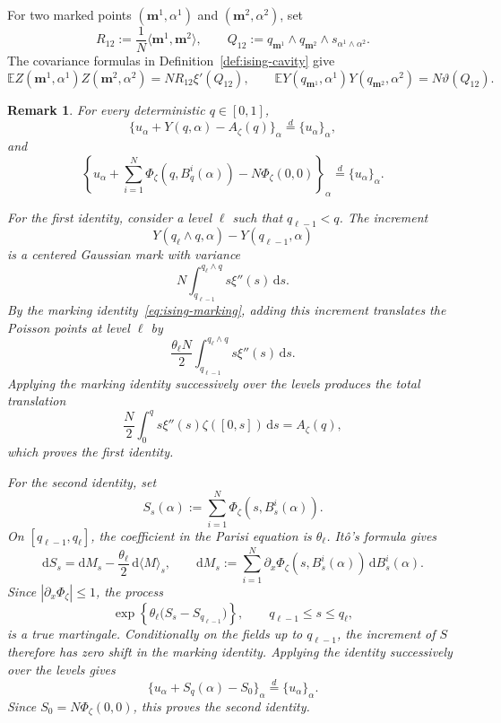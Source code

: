 \documentclass[a4paper,10pt,reqno]{amsart}
\numberwithin{equation}{section}
\newtheorem{remark}{Remark}[section]%
\newcommand{\dE}{\mathbb{E}}%
\newcommand{\dd}{\mathrm{d}}
\newcommand{\bfm}{\mathbf{m}}
\begin{document}
	For two marked points $(\bfm^1,\alpha^1)$ and
	$(\bfm^2,\alpha^2)$, set
	\[
	R_{12}:=\frac1N\langle\bfm^1,\bfm^2\rangle,
	\qquad
	Q_{12}:=
	q_{\bfm^1}\wedge q_{\bfm^2}\wedge
	s_{\alpha^1\wedge\alpha^2}.
	\]
	The covariance formulas in Definition~\ref{def:ising-cavity} give
	\begin{equation}\label{eq:ising-covs}
		\dE Z(\bfm^1,\alpha^1)Z(\bfm^2,\alpha^2)
		=
		NR_{12}\xi'(Q_{12}),
		\qquad
		\dE Y(q_{\bfm^1},\alpha^1)Y(q_{\bfm^2},\alpha^2)
		=
		N\vartheta(Q_{12}).
	\end{equation}
	\begin{remark}\label{rem:ising-invariance}
		For every deterministic $q\in[0,1]$,
		\[
		\{u_\alpha+Y(q,\alpha)-A_\zeta(q)\}_\alpha
		\stackrel d=
		\{u_\alpha\}_\alpha,
		\]
		and
		\[
		\left\{
		u_\alpha
		+
		\sum_{i=1}^N\Phi_\zeta(q,B_q^i(\alpha))
		-
		N\Phi_\zeta(0,0)
		\right\}_\alpha
		\stackrel d=
		\{u_\alpha\}_\alpha.
		\]
		
		For the first identity, consider a level $\ell$ such that $q_{\ell-1}<q$. The increment
		\[
		Y(q_\ell\wedge q,\alpha)-Y(q_{\ell-1},\alpha)
		\]
		is a centered Gaussian mark with variance
		\[
		N\int_{q_{\ell-1}}^{q_\ell\wedge q}s\xi''(s)\,\dd s.
		\]
		By the marking identity~\eqref{eq:ising-marking}, adding this increment translates the Poisson points at level
		$\ell$ by
		\[
		\frac{\theta_\ell N}{2}
		\int_{q_{\ell-1}}^{q_\ell\wedge q}s\xi''(s)\,\dd s.
		\]
		Applying the marking identity successively over the levels produces the total translation
		\[
		\frac N2\int_0^q s\xi''(s)\zeta([0,s])\,\dd s=A_\zeta(q),
		\]
		which proves the first identity.
		
		For the second identity, set
		\[
		S_s(\alpha):=\sum_{i=1}^N\Phi_\zeta(s,B_s^i(\alpha)).
		\]
		On $[q_{\ell-1},q_\ell]$, the coefficient in the Parisi equation is $\theta_\ell$. It\^o's formula gives
		\[
		\dd S_s
		=
		\dd M_s-\frac{\theta_\ell}{2}\,\dd\langle M\rangle_s,
		\qquad
		\dd M_s:=
		\sum_{i=1}^N
		\partial_x\Phi_\zeta(s,B_s^i(\alpha))\,\dd B_s^i(\alpha).
		\]
		Since $|\partial_x\Phi_\zeta|\le1$, the process
		\[
		\exp\left\{\theta_\ell\bigl(S_s-S_{q_{\ell-1}}\bigr)\right\},
		\qquad q_{\ell-1}\le s\le q_\ell,
		\]
		is a true martingale. Conditionally on the fields up to $q_{\ell-1}$, the increment of $S$ therefore has zero
		shift in the marking identity. Applying the identity successively over the levels gives
		\[
		\{u_\alpha+S_q(\alpha)-S_0\}_\alpha
		\stackrel d=
		\{u_\alpha\}_\alpha.
		\]
		Since $S_0=N\Phi_\zeta(0,0)$, this proves the second identity.
	\end{remark}
	
\end{document}
